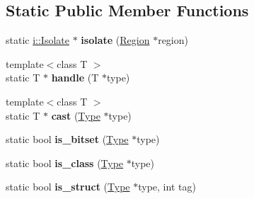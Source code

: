 \subsection*{Static Public Member Functions}
\begin{DoxyCompactItemize}
\item 
\hypertarget{structv8_1_1internal_1_1_zone_type_config_a90489fcead81cdbce6fa56fef1f0a0b4}{}static \hyperlink{classv8_1_1internal_1_1_isolate}{i\+::\+Isolate} $\ast$ {\bfseries isolate} (\hyperlink{classv8_1_1internal_1_1_zone}{Region} $\ast$region)\label{structv8_1_1internal_1_1_zone_type_config_a90489fcead81cdbce6fa56fef1f0a0b4}

\item 
\hypertarget{structv8_1_1internal_1_1_zone_type_config_aafd7f4c6786a1b84401118c3693c2058}{}{\footnotesize template$<$class T $>$ }\\static T $\ast$ {\bfseries handle} (T $\ast$type)\label{structv8_1_1internal_1_1_zone_type_config_aafd7f4c6786a1b84401118c3693c2058}

\item 
\hypertarget{structv8_1_1internal_1_1_zone_type_config_a6e1205576f42fdb939dc40ec02e29810}{}{\footnotesize template$<$class T $>$ }\\static T $\ast$ {\bfseries cast} (\hyperlink{classv8_1_1internal_1_1_type_impl}{Type} $\ast$type)\label{structv8_1_1internal_1_1_zone_type_config_a6e1205576f42fdb939dc40ec02e29810}

\item 
\hypertarget{structv8_1_1internal_1_1_zone_type_config_adf59139ec762015ffabddb62c5ccd644}{}static bool {\bfseries is\+\_\+bitset} (\hyperlink{classv8_1_1internal_1_1_type_impl}{Type} $\ast$type)\label{structv8_1_1internal_1_1_zone_type_config_adf59139ec762015ffabddb62c5ccd644}

\item 
\hypertarget{structv8_1_1internal_1_1_zone_type_config_ac06cb87b16e9d7a9069f54365c60cf9a}{}static bool {\bfseries is\+\_\+class} (\hyperlink{classv8_1_1internal_1_1_type_impl}{Type} $\ast$type)\label{structv8_1_1internal_1_1_zone_type_config_ac06cb87b16e9d7a9069f54365c60cf9a}

\item 
\hypertarget{structv8_1_1internal_1_1_zone_type_config_a5b18e4069d6107efd654567dd4ccc8c5}{}static bool {\bfseries is\+\_\+struct} (\hyperlink{classv8_1_1internal_1_1_type_impl}{Type} $\ast$type, int tag)\label{structv8_1_1internal_1_1_zone_type_config_a5b18e4069d6107efd654567dd4ccc8c5}


\end{DoxyCompactItemize}

